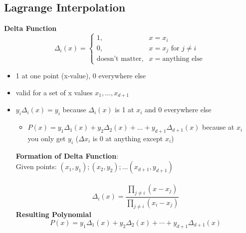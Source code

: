 \documentclass{article}\usepackage{amsmath,amssymb,amsthm,tikz,tkz-graph,color,chngpage,soul,hyperref,csquotes,graphicx,floatrow, listings,polynom}\newcommand*{\QEDB}{\hfill\ensuremath{\square}}\newtheorem*{prop}{Proposition}\renewcommand{\theenumi}{\alph{enumi}}\usepackage[shortlabels]{enumitem}\usepackage[nobreak=true]{mdframed}\usetikzlibrary{matrix,calc}\MakeOuterQuote{"}\usepackage[margin=0.75in]{geometry} \newtheorem{theorem}{Theorem}\newcommand{\Z}{\mathbb Z}\newcommand{\R}{\mathbb R}\newcommand{\Q}{\mathbb Q}\newcommand{\N}{\mathbb N}\newcommand{\x}[1]{\textrm{ #1 }}\newcommand{\pr}{\textrm{Pr}}
\newcommand{\eq}[1]{\begin{equation}#1\end{equation}}
\begin{document}
\subsection*{Lagrange Interpolation}
\textbf{Delta Function}
\eq{
\Delta_i(x) =
\begin{cases}
1, & x =x_i \\
0, & x =x_j \text{ for } j\ne i \\
\text{doesn't matter}, & x = \text{anything else}
\end{cases}
}
\begin{itemize}
\item 1 at one point (x-value), 0 everywhere else
\item valid for a set of x values $x_1, ..., x_{d+1}$
\item $y_i\Delta_i(x) = y_i$ because $\Delta_i(x)$ is 1 at $x_i$ and 0 everywhere else
	\begin{itemize}[label=$\star$]
	\item $P(x) = y_1\Delta_1(x) + y_2\Delta_2(x) + ... + y_{d+1}\Delta_{d+1}(x)$ because at $x_i$ you only get $y_i$ ($\Delta{x_i}$ is 0 at anything except $x_i$)
	\end{itemize}
\begin{mdframed}
\textbf{Formation of Delta Function}:\\
Given points: $(x_1, y_1); (x_2, y_2); ... (x_{d+1}, y_{d+1})$\\\\
\eq{\Delta_i(x) = \frac{\prod_{j\ne i}(x-x_j)}{\prod_{j\ne i}(x_i-x_j)}}
\textbf{Resulting Polynomial}
\eq{P(x)=y_1\Delta_1(x)+y_2\Delta_2(x)+\cdots+y_{d+1}\Delta_{d+1}(x)}
\end{mdframed}
\end{itemize}
\end{document}
